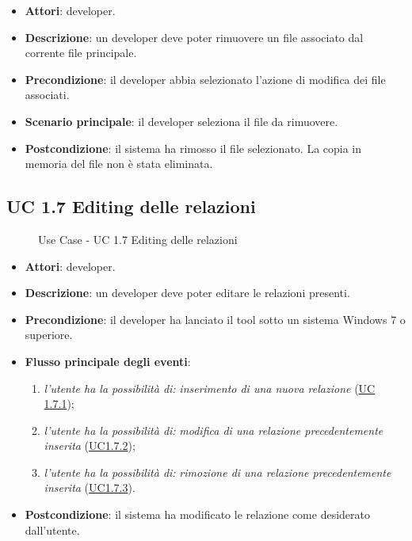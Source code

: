 		\begin{itemize}
			\item\textbf{Attori}: developer.
			\item\textbf{Descrizione}: un developer deve poter rimuovere un file associato dal corrente file principale.
			\item\textbf{Precondizione}: il developer abbia selezionato l'azione di modifica dei file associati.
			\item\textbf{Scenario principale}: il developer seleziona il file da rimuovere.
			\item\textbf{Postcondizione}: il sistema ha rimosso il file selezionato. La copia in memoria del file non è stata eliminata.
		\end{itemize}
		
	\subsection{UC 1.7 Editing delle relazioni}
		\label{subsec:XEUC1.7}
		
		\begin{figure}[!h] 
			\centering 
			\caption{Use Case - UC 1.7 Editing delle relazioni}
		\end{figure}
		
		\begin{itemize}
			\item\textbf{Attori}: developer.
			\item\textbf{Descrizione}: un developer deve poter editare le relazioni presenti.
			\item\textbf{Precondizione}: il developer ha lanciato il tool sotto un sistema Windows 7 o superiore.
			\item\textbf{Flusso principale degli eventi}: 
			\begin{enumerate}
				\item \textit{l'utente ha la possibilità di:} \textit{inserimento di una nuova relazione} (\hyperref[subsec:XEUC1.7.1]{UC 1.7.1});
				
				\item \textit{l'utente ha la possibilità di:} \textit{modifica di una relazione precedentemente inserita} (\hyperref[subsec:XEUC1.7.2]{UC1.7.2});
				
				\item \textit{l'utente ha la possibilità di:} \textit{rimozione di una relazione precedentemente inserita} (\hyperref[subsec:XEUC1.7.3]{UC1.7.3}).
				
			\end{enumerate}
			\item\textbf{Postcondizione}: il sistema ha modificato le relazione come desiderato dall'utente.
		\end{itemize}
		
